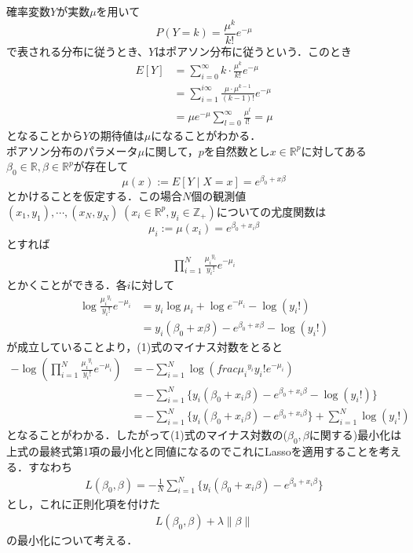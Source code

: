\documentclass{jsarticle}
\theoremstyle{definition}
\theoremstyle{mystyle} %
\begin{document}
\Large
確率変数$Y$が実数$\mu$を用いて
$$P(Y=k)=\frac{\mu^k}{k!}e^{-\mu}$$
で表される分布に従うとき、$Y$はポアソン分布に従うという．このとき
\begin{align*}
E[Y]&=\sum_{i=0}^{\infty}k\cdot \frac{\mu^k}{k!}e^{-\mu}\\
&=\sum_{i=1}^{i\infty}\frac{\mu\cdot \mu^{k-1}}{(k-1)!}e^{-\mu}\\
&=\mu e^{-\mu}\sum_{l=0}^{\infty}\frac{\mu^l}{l!}=\mu
\end{align*}
となることから$Y$の期待値は$\mu$になることがわかる．\\

ポアソン分布のパラメータ$\mu$に関して，$p$を自然数とし$x\in \mathbb{R}^p$に対してある$\beta_0\in \mathbb{R},\beta\in \mathbb{R}^p$が存在して
$$\mu(x):=E[Y\mid X=x]=e^{\beta_0+x\beta}$$
とかけることを仮定する．この場合$N$個の観測値$(x_1,y_1),\cdots ,(x_N,y_N)\;(x_i\in \mathbb{R}^p,y_i\in\mathbb{Z}_+)$についての尤度関数は
$$\mu_i:=\mu(x_i)=e^{\beta_0+x_i\beta}$$
とすれば
\begin{align}
\prod_{i=1}^N\frac{{\mu_i}^{y_i}}{y_i!}e^{-\mu_i}
\end{align}
とかくことができる．各$i$に対して
\begin{align*}
\log\frac{{\mu_i}^{y_i}}{y_i!}e^{-\mu_i}&=y_i\log \mu_i+\log e^{-\mu_i}-\log(y_i!)\\
&=y_i(\beta_0+x\beta)-e^{\beta_0+x\beta}-\log(y_i!)
\end{align*}
が成立していることより，(1)式のマイナス対数をとると
\begin{align*}
-\log\left(\prod_{i=1}^N\frac{{\mu_i}^{y_i}}{y_i!}e^{-\mu_i}\right)&=-\sum_{i=1}^N\log\left(frac{{\mu_i}^{y_i}}{y_i!}e^{-\mu_i}\right)\\
&=-\sum_{i=1}^N\{y_i(\beta_0+x_i\beta)-e^{\beta_0+x_i\beta}-\log(y_i!)\}\\
&=-\sum_{i=1}^N\{y_i(\beta_0+x_i\beta)-e^{\beta_0+x_i\beta}\}+\sum_{i=1}^N\log(y_i!)
\end{align*}
となることがわかる．したがって(1)式のマイナス対数の($\beta_0,\beta$に関する)最小化は上式の最終式第1項の最小化と同値になるのでこれにLassoを適用することを考える．すなわち
\begin{align*}
L(\beta_0,\beta)=-\frac{1}{N}\sum_{i=1}^N\{y_i(\beta_0+x_i\beta)-e^{\beta_0+x_i\beta}\}
\end{align*}
とし，これに正則化項を付けた
\begin{align*}
L(\beta_0,\beta)+\lambda\|\beta\|
\end{align*}
の最小化について考える．\\
\end{document}
